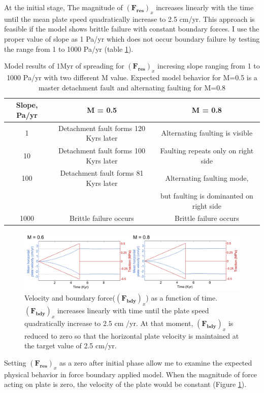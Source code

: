 \documentclass[letterpaper,12pt,notitle]{memphisthesis}                     %
\begin{document}
At the initial stage, The magnitude of $(\boldsymbol{F_{res}})_x$ increases linearly with the time until the mean plate speed quadratically increase to 2.5 cm/yr. This approach is feasible if the model shows brittle failure with constant boundary forces. I use the proper value of slope as 1 Pa/yr which does not occur boundary failure by testing the range from 1 to 1000 Pa/yr (table \ref{tab:slope}). 
%
\begin{table}[h!]
	\centering
	\caption{Model results of 1Myr of spreading for $(\boldsymbol{F_{res}})_x$ incresing slope ranging from 1 to 1000 Pa/yr with two different M value. Expected model behavior for M=0.5 is a master detachment fault and alternating faulting for M=0.8}
	\label{tab:slope}
	\begin{tabular}{ccc}
		\toprule
		Slope, Pa/yr & M = 0.5 & M = 0.8\\
		\midrule
          	1 & Detachment fault forms 120 Kyrs later & Alternating faulting is visible\\
		10 & Detachment fault forms 100 Kyrs later & Faulting repeats only on right side\\
		100 & Detachment fault forms 81 Kyrs later & Alternating faulting mode, \\
		&&but faulting is dominanted on right side\\
		1000 & Brittle failure occurs & Brittle failure occurs\\
		\bottomrule
	\end{tabular}
\end{table}
%
\begin{figure}[!htb]
	\centering
	\includegraphics[width=0.99\linewidth]{./figs/force0.pdf}
	\caption{Velocity and boundary force($(\boldsymbol{F_{bdy}})_x$) as a function of time. $(\boldsymbol{F_{bdy}})_x$ increases linearly with time until the plate speed quadratically increase to 2.5 cm /yr. At that moment, $(\boldsymbol{F_{bdy}})_x$ is reduced to zero so that the horizontal plate velocity is maintained at the target value of 2.5 cm/yr.}
	\label{fig:force0}
\end{figure}

Setting $(\boldsymbol{F_{res}})_x$ as a zero after initial phase allow me to examine the expected physical behavior in force boundary applied model. When the magnitude of force acting on plate is zero, the velocity of the plate would be constant (Figure \ref{fig:force0}).
\end{document}

